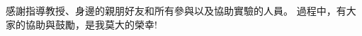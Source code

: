 \begin{acknowledgements} 

感謝指導教授、身邊的親朋好友和所有參與以及協助實驗的人員。
過程中，有大家的協助與鼓勵，是我莫大的榮幸!


\end{acknowledgements} 